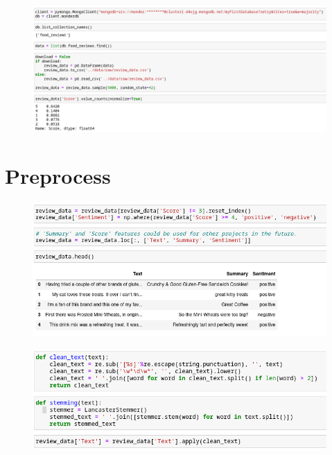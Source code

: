 \documentclass{beamer}
\begin{document}
\begin{frame}
    \begin{figure}
        \includegraphics[width=\textwidth]{../figures/mongo_to_csv.png}
    \end{figure}
\end{frame}

\section{Preprocess}

\begin{frame}
    \begin{figure}
        \includegraphics[width=\textwidth]{../figures/pre_sentiment.png}
    \end{figure}
\end{frame}

\begin{frame}
    \begin{figure}
        \includegraphics[width=\textwidth]{../figures/pre_clean.png}
    \end{figure}
\end{frame}
\end{document}
